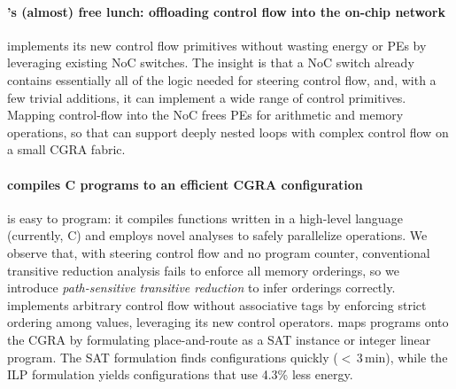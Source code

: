 \paragraph{\riptide's (almost) free lunch: offloading control flow into the on-chip network}

\riptide implements its new control flow primitives without wasting energy
or PEs by leveraging existing NoC switches.
%
The insight is that a NoC switch already contains essentially all of
the logic needed for steering control flow, and, with a few
trivial additions, it can implement a wide range of control primitives.
%
Mapping control-flow into the NoC frees PEs for arithmetic and memory
operations, so that \riptide can support deeply nested loops with complex
control flow on a small CGRA fabric.


\paragraph{\riptide compiles C programs to an efficient CGRA configuration}
\riptide is easy to program: it compiles functions written in a high-level
language (currently, C) and employs novel analyses to safely
parallelize operations.
%
We observe that, with steering control flow and no program counter,
conventional transitive reduction analysis fails to enforce all memory
orderings, so we introduce \emph{path-sensitive transitive reduction}
to infer orderings correctly.
%
\riptide implements arbitrary control flow without associative tags by
enforcing strict ordering among values, leveraging its new control
operators.
%
%
\riptide maps programs onto the CGRA by formulating place-and-route as a
SAT instance or integer linear program.
The SAT formulation finds configurations quickly ($<$\,3\,min), while the ILP formulation yields configurations that use 4.3\% less energy.

  
